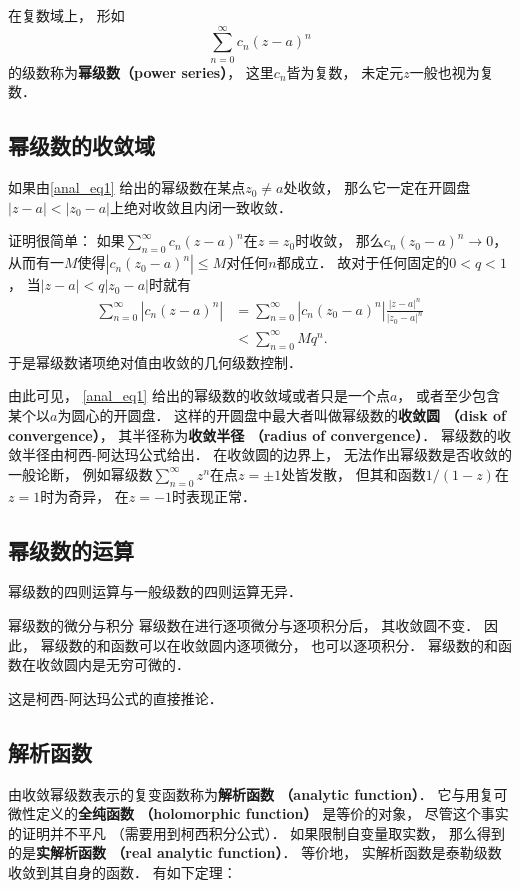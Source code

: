 
在复数域上， 形如
\begin{equation}\label{anal_eq1}
\sum_{n=0}^\infty c_n(z-a)^n
\end{equation}
的级数称为\textbf{幂级数（power series）}， 这里$c_n$皆为复数， 未定元$z$一般也视为复数． 

\subsection{幂级数的收敛域}
\begin{theorem}{}
如果由\autoref{anal_eq1} 给出的幂级数在某点$z_0\neq a$处收敛， 那么它一定在开圆盘$|z-a|<|z_0-a|$上绝对收敛且内闭一致收敛．
\end{theorem}

证明很简单： 如果$\sum_{n=0}^\infty c_n(z-a)^n$在$z=z_0$时收敛， 那么$c_n(z_0-a)^n\to0$， 从而有一$M$使得$|c_n(z_0-a)^n|\leq M$对任何$n$都成立． 故对于任何固定的$0<q<1$， 当$|z-a|<q|z_0-a|$时就有
$$
\begin{aligned}
\sum_{n=0}^\infty |c_n(z-a)^n|
&=\sum_{n=0}^\infty |c_n(z_0-a)^n|\frac{|z-a|^n}{|z_0-a|^n}\\
&<\sum_{n=0}^\infty Mq^n.
\end{aligned}
$$
于是幂级数诸项绝对值由收敛的几何级数控制．

由此可见， \autoref{anal_eq1} 给出的幂级数的收敛域或者只是一个点$a$， 或者至少包含某个以$a$为圆心的开圆盘． 这样的开圆盘中最大者叫做幂级数的\textbf{收敛圆 （disk of convergence）}， 其半径称为\textbf{收敛半径 （radius of convergence）}． 幂级数的收敛半径由柯西-阿达玛公式给出． 在收敛圆的边界上， 无法作出幂级数是否收敛的一般论断， 例如幂级数$\sum_{n=0}^\infty z^n$在点$z=\pm1$处皆发散， 但其和函数$1/(1-z)$在$z=1$时为奇异， 在$z=-1$时表现正常．

\subsection{幂级数的运算}
幂级数的四则运算与一般级数的四则运算无异．

\begin{theorem}{幂级数的微分与积分}
幂级数在进行逐项微分与逐项积分后， 其收敛圆不变． 因此， 幂级数的和函数可以在收敛圆内逐项微分， 也可以逐项积分． 幂级数的和函数在收敛圆内是无穷可微的．
\end{theorem}
这是柯西-阿达玛公式的直接推论． 

\subsection{解析函数}
由收敛幂级数表示的复变函数称为\textbf{解析函数 （analytic function）}． 它与用复可微性定义的\textbf{全纯函数 （holomorphic function）} 是等价的对象， 尽管这个事实的证明并不平凡 （需要用到柯西积分公式）． 如果限制自变量取实数， 那么得到的是\textbf{实解析函数 （real analytic function）}． 等价地， 实解析函数是泰勒级数收敛到其自身的函数． 有如下定理：

